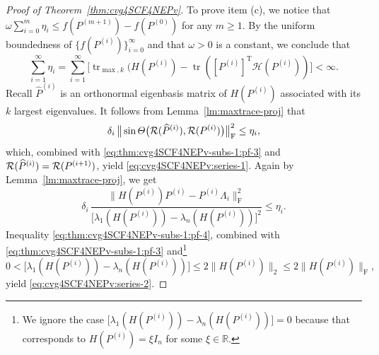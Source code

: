 \documentclass[11pt]{article}
\def\bbR{\mathbb{R}}
\def\scrH{\mathscr{H}}
\def\cR{{\cal R}}
\def\what{\widehat}
\newcommand\STM[2]{{\rm St}(#1,#2)}
\DeclareMathOperator{\tr}{tr}
\DeclareMathOperator{\F}{F}
\DeclareMathOperator{\T}{T}
\theoremstyle{definition}
\numberwithin{equation}{section}
\begin{document}
\begin{proof}[Proof of Theorem~\ref{thm:cvg4SCF4NEPv}]
To prove item (c), we notice that
$\omega\sum_{i=0}^m\eta_i\le f(P^{(m+1)})-f(P^{(0)})$ for any $m\ge 1$.
By the uniform boundedness of $\{f(P^{(i)})\}_{i=0}^{\infty}$ and that $\omega>0$ is a constant, we conclude that
\begin{equation}\label{eq:thm:cvg4SCF4NEPv-subs-1:pf-3}
\sum_{i=1}^{\infty}\eta_i
=\sum_{i=1}^{\infty}\Big[\tr_{\max,k}(H(P^{(i)})-\tr([P^{(i)}]^{\T}\scrH(P^{(i)}))\Big]
<\infty.
\end{equation}
Recall $\what P^{(i)}$ is an orthonormal eigenbasis matrix of $H(P^{(i)})$ associated with its $k$ largest eigenvalues.
It follows from Lemma~\ref{lm:maxtrace-proj} that
\begin{equation}\label{eq:thm:cvg4SCF4NEPv-subs-1:pf-3'}
\delta_i\,\big\|\sin\Theta\big(\cR(\what P^{(i)}),\cR(P^{(i)})\big)\big\|_{\F}^2\le \eta_i,
\end{equation}
which, combined with \eqref{eq:thm:cvg4SCF4NEPv-subs-1:pf-3} and $\cR(\what P^{(i)})=\cR(P^{(i+1)})$, yield \eqref{eq:cvg4SCF4NEPv:series-1}.
Again by Lemma~\ref{lm:maxtrace-proj}, we get
\begin{equation}\label{eq:thm:cvg4SCF4NEPv-subs-1:pf-4}
\delta_i\,\frac {\big\|H(P^{(i)})P^{(i)}-P^{(i)}\Lambda_i\big\|_{\F}^2}
                {\big[\lambda_1(H(P^{(i)}))-\lambda_n(H(P^{(i)}))\big]^2}
     \le \eta_i.
\end{equation}
Inequality \eqref{eq:thm:cvg4SCF4NEPv-subs-1:pf-4}, combined with \eqref{eq:thm:cvg4SCF4NEPv-subs-1:pf-3}
and\footnote {We ignore the case $\big[\lambda_1(H(P^{(i)}))-\lambda_n(H(P^{(i)}))\big]=0$ because that corresponds
              to $H(P^{(i)})=\xi I_n$ for some $\xi\in\bbR$.}
\begin{equation}\label{eq:thm:cvg4SCF4NEPv-subs-1:pf-5}
0<\big[\lambda_1(H(P^{(i)}))-\lambda_n(H(P^{(i)}))\big]\le 2\|H(P^{(i)})\|_2\le2\|H(P^{(i)})\|_{\F},
\end{equation}
yield \eqref{eq:cvg4SCF4NEPv:series-2}.
\end{proof}
\end{document}
